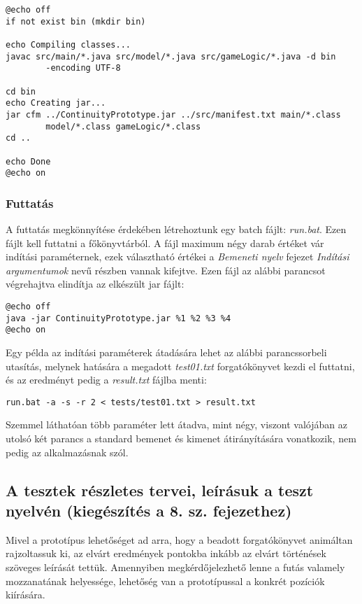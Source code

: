 \begin{verbatim}
@echo off
if not exist bin (mkdir bin)

echo Compiling classes...
javac src/main/*.java src/model/*.java src/gameLogic/*.java -d bin
        -encoding UTF-8

cd bin
echo Creating jar...
jar cfm ../ContinuityPrototype.jar ../src/manifest.txt main/*.class
        model/*.class gameLogic/*.class
cd ..

echo Done
@echo on
\end{verbatim}

\subsubsection{Futtatás}
A futtatás megkönnyítése érdekében létrehoztunk egy batch fájlt: \emph{run.bat}. Ezen fájlt kell futtatni a főkönyvtárból. A fájl maximum négy darab értéket vár indítási paraméternek, ezek választható értékei a \emph{Bemeneti nyelv} fejezet \emph{Indítási argumentumok} nevű részben vannak kifejtve. Ezen fájl az alábbi parancsot végrehajtva elindítja az elkészült jar fájlt: 

\begin{verbatim}
@echo off
java -jar ContinuityPrototype.jar %1 %2 %3 %4
@echo on
\end{verbatim}

Egy példa az indítási paraméterek átadására lehet az alábbi parancssorbeli utasítás, melynek hatására a megadott \emph{test01.txt} forgatókönyvet kezdi el futtatni, és az eredményt pedig a \emph{result.txt} fájlba menti:

\begin{verbatim}
run.bat -a -s -r 2 < tests/test01.txt > result.txt
\end{verbatim}

Szemmel láthatóan több paraméter lett átadva, mint négy, viszont valójában az utolsó két parancs a standard bemenet és kimenet átirányítására vonatkozik, nem pedig az alkalmazásnak szól.


\subsection{A tesztek részletes tervei, leírásuk a teszt nyelvén (kiegészítés a 8. sz. fejezethez)}

Mivel a prototípus lehetőséget ad arra, hogy a beadott forgatókönyvet animáltan rajzoltassuk ki, az elvárt eredmények pontokba inkább az elvárt történések szöveges leírását tettük. Amennyiben megkérdőjelezhető lenne a futás valamely mozzanatának helyessége, lehetőség van a prototípussal a konkrét pozíciók kiírására.

